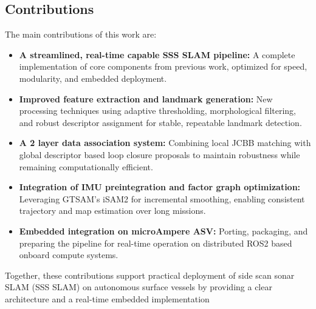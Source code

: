 \subsection{Contributions}
The main contributions of this work are:
\begin{itemize}
    \item \textbf{A streamlined, real-time capable SSS SLAM pipeline:} A complete implementation of core components from previous work, optimized for speed, modularity, and embedded deployment.
    \item \textbf{Improved feature extraction and landmark generation:} New processing techniques using adaptive thresholding, morphological filtering, and robust descriptor assignment for stable, repeatable landmark detection.
    \item \textbf{A 2 layer data association system:} Combining local JCBB matching with global descriptor based loop closure proposals to maintain robustness while remaining computationally efficient.
    \item \textbf{Integration of IMU preintegration and factor graph optimization:} Leveraging GTSAM's iSAM2 for incremental smoothing, enabling consistent trajectory and map estimation over long missions.
    \item \textbf{Embedded integration on microAmpere ASV:} Porting, packaging, and preparing the pipeline for real-time operation on distributed ROS2 based onboard compute systems.
\end{itemize}
Together, these contributions support practical deployment of side scan sonar SLAM (SSS SLAM) on autonomous surface vessels by providing a clear architecture and a real-time embedded implementation
